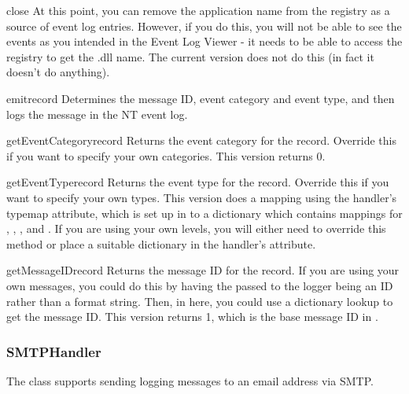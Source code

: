 \begin{methoddesc}{close}{}
At this point, you can remove the application name from the registry as a
source of event log entries. However, if you do this, you will not be able
to see the events as you intended in the Event Log Viewer - it needs to be
able to access the registry to get the .dll name. The current version does
not do this (in fact it doesn't do anything).
\end{methoddesc}

\begin{methoddesc}{emit}{record}
Determines the message ID, event category and event type, and then logs the
message in the NT event log.
\end{methoddesc}

\begin{methoddesc}{getEventCategory}{record}
Returns the event category for the record. Override this if you
want to specify your own categories. This version returns 0.
\end{methoddesc}

\begin{methoddesc}{getEventType}{record}
Returns the event type for the record. Override this if you want
to specify your own types. This version does a mapping using the
handler's typemap attribute, which is set up in 
to a dictionary which contains mappings for ,
, ,  and
. If you are using your own levels, you will either need
to override this method or place a suitable dictionary in the
handler's  attribute.
\end{methoddesc}

\begin{methoddesc}{getMessageID}{record}
Returns the message ID for the record. If you are using your
own messages, you could do this by having the  passed to the
logger being an ID rather than a format string. Then, in here,
you could use a dictionary lookup to get the message ID. This
version returns 1, which is the base message ID in
.
\end{methoddesc}

\subsubsection{SMTPHandler}

The  class supports sending logging messages to an email
address via SMTP.

